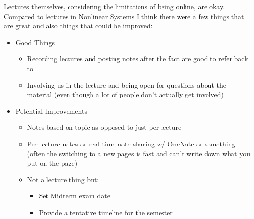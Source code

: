 \documentclass[letter]{article}
\numberwithin{equation}{section}
\begin{document}
Lectures themselves, considering the limitations of being online, are okay.
Compared to lectures in Nonlinear Systems I think there were a few things that are great and also things that could be improved:
\begin{itemize}
	\item Good Things
	\begin{itemize}
		\item Recording lectures and posting notes after the fact are good to refer back to
		\item Involving us in the lecture and being open for questions about the material
				(even though a lot of people don't actually get involved)
	\end{itemize}
	\item Potential Improvements
	\begin{itemize}
		\item Notes based on topic as opposed to just per lecture
		\item Pre-lecture notes or real-time note sharing w/ OneNote or something 
				(often the switching to a new pages is fast and can't write down what you put on the page)
		\item Not a lecture thing but: 
		\begin{itemize}
			\item Set Midterm exam date
			\item Provide a tentative timeline for the semester
		\end{itemize}
	\end{itemize}
\end{itemize}


\end{document}
